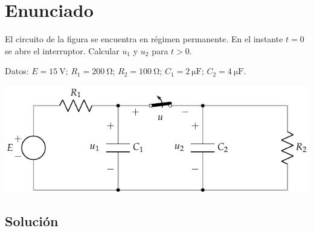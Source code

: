 \section{Enunciado}
El circuito de la figura se encuentra en régimen permanente. En el instante $t=0$ se abre el interruptor. Calcular $u_1$ y $u_2$ para $t>0$. 

Datos: $E = \qty{15}{\volt}$; $R_1 = \qty{200}{\ohm}$; $R_2 = \qty{100}{\ohm}$; $C_1 = \qty{2}{\micro\farad}$; $C_2 = \qty{4}{\micro\farad}$.

\begin{center}
  \includegraphics{figuras/BT4_02.pdf}
\end{center}

\subsection*{Solución}

